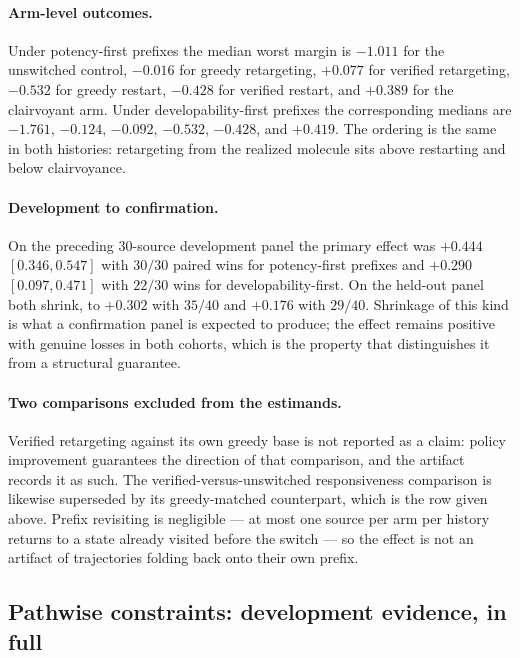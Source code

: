 \paragraph{Arm-level outcomes.}
Under potency-first prefixes the median worst margin is $-1.011$ for the unswitched control, $-0.016$ for greedy retargeting, $+0.077$ for verified retargeting, $-0.532$ for greedy restart, $-0.428$ for verified restart, and $+0.389$ for the clairvoyant arm. Under developability-first prefixes the corresponding medians are $-1.761$, $-0.124$, $-0.092$, $-0.532$, $-0.428$, and $+0.419$. The ordering is the same in both histories: retargeting from the realized molecule sits above restarting and below clairvoyance.

\paragraph{Development to confirmation.}
On the preceding $30$-source development panel the primary effect was $+0.444$ $[0.346,0.547]$ with $30/30$ paired wins for potency-first prefixes and $+0.290$ $[0.097,0.471]$ with $22/30$ wins for developability-first. On the held-out panel both shrink, to $+0.302$ with $35/40$ and $+0.176$ with $29/40$. Shrinkage of this kind is what a confirmation panel is expected to produce; the effect remains positive with genuine losses in both cohorts, which is the property that distinguishes it from a structural guarantee.

\paragraph{Two comparisons excluded from the estimands.}
Verified retargeting against its own greedy base is not reported as a claim: policy improvement guarantees the direction of that comparison, and the artifact records it as such. The verified-versus-unswitched responsiveness comparison is likewise superseded by its greedy-matched counterpart, which is the row given above. Prefix revisiting is negligible --- at most one source per arm per history returns to a state already visited before the switch --- so the effect is not an artifact of trajectories folding back onto their own prefix.

\subsection{Pathwise constraints: development evidence, in full}
\label{app:ext-pathwise}

